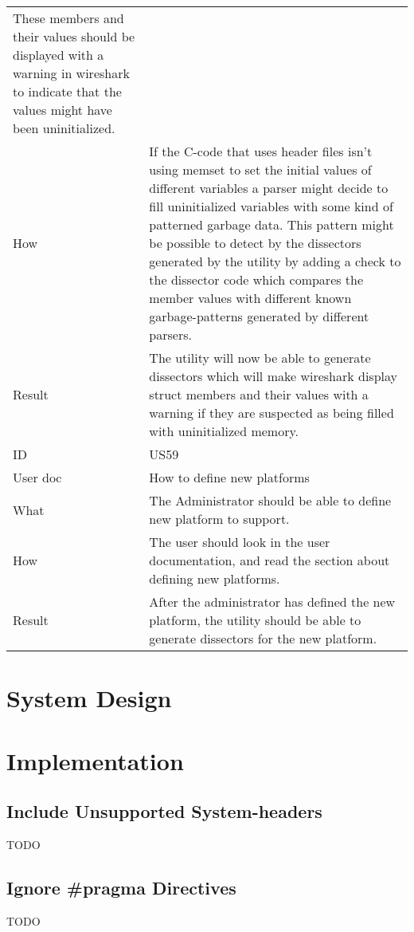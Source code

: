 \begin{table}[htbp]
{\begin{tabularx}{1.2\textwidth}{l X}
 	These members and their values should be displayed with a warning in wireshark to indicate that the values might have been uninitialized.  \\
	How & If the C-code that uses header files isn’t using memset to set the initial values of different variables a parser might decide to fill uninitialized variables with some kind of patterned garbage data.
 	This pattern might be possible to detect by the dissectors generated by the utility by adding a check to the dissector code which compares 	the member values with different known garbage-patterns generated by different parsers. \\
	Result & The utility will now be able to generate dissectors which will make wireshark display struct members and their values with a warning if they are suspected as being filled with uninitialized memory. \\	
	\midrule
	ID & US59 \\
	User doc & How to define new platforms \\
	What & The Administrator should be able to define new platform to support.  \\
	How & The user should look in the user documentation, and read the section about defining new platforms. \\
	Result & After the administrator has defined the new platform, the utility should be able to generate dissectors for the new platform. \\	
	\bottomrule
\end{tabularx}}
\end{table}

\section{System Design}


\section{Implementation}

\subsection{Include Unsupported System-headers}
TODO

\subsection{Ignore \#pragma Directives}
TODO

